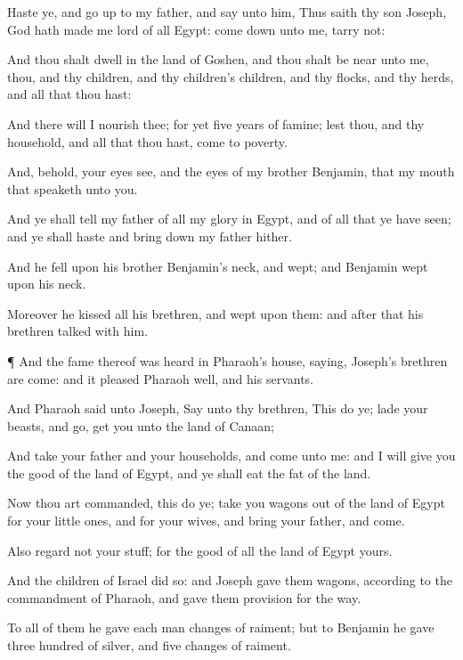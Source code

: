 {Haste ye, and go
up to my
father, and
say unto him, Thus
saith thy
son
Joseph,
God hath
made me
lord of all
Egypt: come
down unto me,
tarry not:

And thou shalt
dwell in the
land of
Goshen, and thou shalt be
near unto me, thou, and thy
children, and thy
children’s
children, and thy
flocks, and thy
herds, and all that thou hast:

And there will I
nourish thee; for yet
{}
five
years of
famine; lest thou, and thy
household, and all that thou hast, come to
poverty.

And, behold, your
eyes
see, and the
eyes of my
brother
Benjamin, that
{} my
mouth that
speaketh unto you.

And ye shall
tell my
father of all my
glory in
Egypt, and of all that ye have
seen; and ye shall
haste and bring
down my
father hither.

And he
fell upon his
brother
Benjamin’s
neck, and
wept; and
Benjamin
wept upon his
neck.

Moreover he
kissed all his
brethren, and
wept upon them: and
after that his
brethren
talked with him.


\par }{\PP {}¶ And the
fame thereof was
heard in
Pharaoh’s
house,
saying,
Joseph’s
brethren are
come: and it
pleased
Pharaoh
well,
and his
servants.

And
Pharaoh
said unto
Joseph,
Say unto thy
brethren, This
do ye;
lade your
beasts, and
go,
get you unto the
land of
Canaan;

And
take your
father and your
households, and
come unto me: and I will
give you the
good of the
land of
Egypt, and ye shall
eat the
fat of the
land.

Now thou art
commanded, this
do ye;
take you
wagons out of the
land of
Egypt for your little
ones, and for your
wives, and
bring your
father, and
come.

Also
regard not your
stuff; for the
good of all the
land of
Egypt
{} yours.

And the
children of
Israel
did so: and
Joseph
gave them
wagons, according to the
commandment of
Pharaoh, and
gave them
provision for the
way.

To all of them he
gave each
man
changes of
raiment; but to
Benjamin he
gave
three
hundred
{} of
silver, and
five
changes of
raiment.

}
